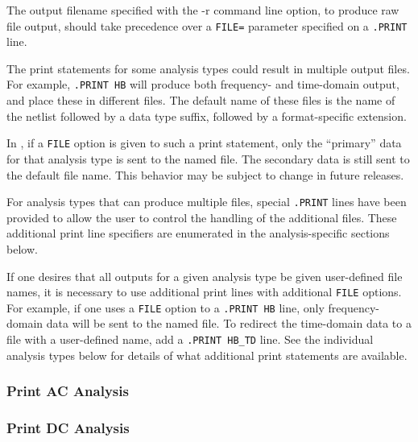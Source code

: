 \begin{Command}
\begin{XyceItemize}
\item The output filename specified with the -r command line option,
  to produce raw file output, should take precedence over
  a {\tt FILE=} parameter specified on a {\tt .PRINT} line.

\item The print statements for some analysis types could result in multiple
  output files.  For example, \texttt{.PRINT HB} will produce both
  frequency- and time-domain output, and place these in different files.
  The default name of these files is the name of the netlist followed by
  a data type suffix, followed by a format-specific extension.

  In \Xyce{}, if a \texttt{FILE} option is given to such a print
  statement, only the ``primary'' data for that analysis type is sent to
  the named file.  The secondary data is still sent to the default file
  name.  This behavior may be subject to change in future releases.

  For analysis types that can produce multiple files,
  special \texttt{.PRINT} lines have been provided to allow the user to
  control the handling of the additional files.  These additional print
  line specifiers are enumerated in the analysis-specific sections
  below.

  If one desires that all outputs for a given analysis type be given
  user-defined file names, it is necessary to use additional print lines
  with additional \texttt{FILE} options.  For example, if one uses
  a \texttt{FILE} option to a \texttt{.PRINT HB} line, only
  frequency-domain data will be sent to the named file.  To redirect the
  time-domain data to a file with a user-defined name, add
  a \texttt{.PRINT HB\_TD} line.  See the individual analysis types
  below for details of what additional print statements are available.
\end{XyceItemize}

\end{Command}

\subsubsection{Print AC Analysis}


\subsubsection{Print DC Analysis}



